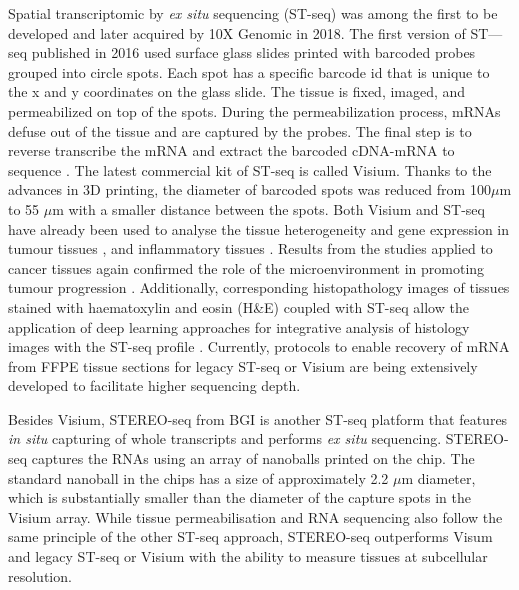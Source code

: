 Spatial transcriptomic by \textit{ex situ} sequencing (ST-seq) was among the first to be developed and later acquired by 10X Genomic in 2018. The first version of ST—seq published in 2016 used surface glass slides printed with barcoded probes grouped into circle spots. Each spot has a specific barcode id that is unique to the x and y coordinates on the glass slide. The tissue is fixed, imaged, and permeabilized on top of the spots. During the permeabilization process, mRNAs defuse out of the tissue and are captured by the probes. The final step is to reverse transcribe the mRNA and extract the barcoded cDNA-mRNA to sequence \cite{staahl2016visualization, berglund2018spatial}. The latest commercial kit of ST-seq is called Visium. Thanks to the advances in 3D printing, the diameter of barcoded spots was reduced from  100$\mu$m to 55 $\mu$m with a smaller distance between the spots.  Both  Visium  and ST-seq have already been used to analyse the tissue heterogeneity and gene expression in tumour tissues \cite{berglund2018spatial, thrane2018spatially, moncada2019integrating,ji2020multimodal, yoosuf2020identification}, and inflammatory tissues \cite{carlberg2019exploring}. Results from the studies applied to cancer tissues again confirmed the role of the microenvironment in promoting tumour progression \cite{thrane2018spatially, moncada2019integrating}. Additionally, corresponding histopathology images of tissues stained with haematoxylin and eosin (H\&E) coupled with ST-seq allow the application of deep learning approaches for integrative analysis of histology images with the ST-seq profile \cite{he2020integrating, tan2019spacell}. Currently, protocols to enable recovery of mRNA from FFPE tissue sections for legacy ST-seq or Visium are being extensively developed to facilitate higher sequencing depth.           

Besides Visium, STEREO-seq from BGI is another ST-seq platform that features \textit{in situ} capturing of whole transcripts and performs \textit{ex situ} sequencing. STEREO-seq captures the RNAs using an array of nanoballs printed on the chip. The standard nanoball in the chips has a size of approximately 2.2 $\mu$m diameter, which is substantially smaller than the diameter of the capture spots in the Visium array. While tissue permeabilisation and RNA sequencing also follow the same principle of the other ST-seq approach, STEREO-seq outperforms Visum and legacy ST-seq or Visium with the ability to measure tissues at subcellular resolution.    

